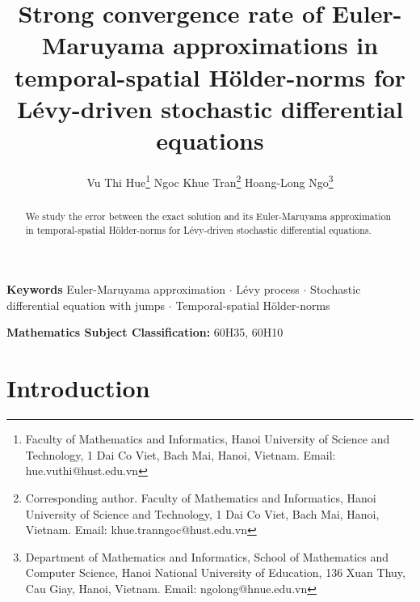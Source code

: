 \documentclass[11pt]{article}
\theoremstyle{theorem}
\theoremstyle{definition}
\newcommand{\1}{{\bf 1}}
\begin{document}
\title{Strong convergence rate of Euler-Maruyama approximations in temporal-spatial H\"older-norms for L\'evy-driven stochastic differential equations}
\author{ Vu Thi Hue\footnote{Faculty of Mathematics and Informatics, Hanoi University of Science and Technology, 1 Dai Co Viet, Bach Mai, Hanoi, Vietnam. Email: hue.vuthi@hust.edu.vn} \quad 
Ngoc Khue Tran\footnote{Corresponding author. Faculty of Mathematics and Informatics, Hanoi University of Science and Technology, 1 Dai Co Viet, Bach Mai, Hanoi, Vietnam. Email: khue.tranngoc@hust.edu.vn} \quad 
Hoang-Long Ngo\footnote{   Department of Mathematics and Informatics, School of Mathematics and Computer Science, Hanoi  National  University  of  Education, 136  Xuan  Thuy, Cau  Giay, Hanoi, Vietnam. Email: ngolong@hnue.edu.vn}}  
\maketitle

\begin{abstract} 
We study the error between the exact solution and its Euler-Maruyama approximation in temporal-spatial H\"older-norms for L\'evy-driven stochastic differential equations. 
\end{abstract} 

\textbf{Keywords} Euler-Maruyama approximation $\cdot$  L\'evy process  $\cdot$ Stochastic differential equation with jumps   $\cdot$ Temporal-spatial H\"older-norms

\textbf{Mathematics Subject Classification:} 60H35,  60H10

\section{Introduction} 
\end{document}
